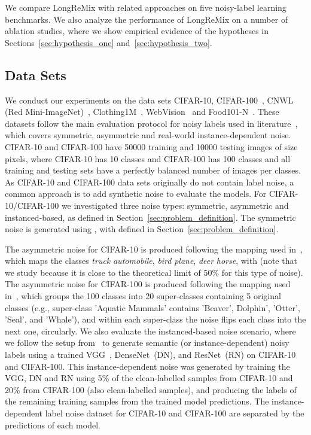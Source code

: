 \documentclass[review]{elsarticle}
\begin{document}
We compare LongReMix with related approaches on five noisy-label learning benchmarks. We also analyze the performance of LongReMix on a number of ablation studies, where we show empirical evidence of the hypotheses in Sections~\ref{sec:hypothesis_one} and~\ref{sec:hypothesis_two}. 


\subsection{Data Sets}
\label{sec:datasets}

We conduct our experiments on the data sets  CIFAR-10, CIFAR-100~\cite{krizhevsky2009learning}, CNWL (Red Mini-ImageNet)~\cite{jiang2020beyond},
Clothing1M~\cite{xiao2015learning}, WebVision~\cite{li2017WebVision} and Food101-N~\cite{lee2018cleannet}. These datasets follow the main evaluation protocol for noisy labels used in literature~\cite{li2020dividemix,ren2018learning,shu2019meta}, which covers symmetric, asymmetric and real-world instance-dependent noise. CIFAR-10 and CIFAR-100 have 50000 training and 10000 testing images of size  pixels, where CIFAR-10 has 10 classes and CIFAR-100 has 100 classes and all training and testing sets have a perfectly balanced number of images per classes. As CIFAR-10 and CIFAR-100 data sets originally do not contain label noise, a common approach is to add synthetic noise to evaluate the models. For CIFAR-10/CIFAR-100 we investigated three  noise types: symmetric, asymmetric and instanced-based, as defined in Section~\ref{sec:problem_definition}. 
The symmetric noise is generated using , with   defined in Section~\ref{sec:problem_definition}.


 The asymmetric noise for CIFAR-10 is produced following the mapping used in~\cite{li2020dividemix}, which maps the classes \emph{truck}  \emph{automobile}, \emph{bird}  \emph{plane}, \emph{deer}  \emph{horse}, with  (note that we study  because it is close to the theoretical limit of 50\% for this type of noise). The asymmetric noise for CIFAR-100 is produced following the mapping used in~\cite{patrini2017making}, which groups the 100 classes into 20 super-classes containing 5 original classes (e.g., super-class 'Aquatic Mammals' contains 'Beaver', Dolphin', 'Otter', 'Seal', and 'Whale'), and within each super-class the noise flips each class into the next one, circularly.  We also evaluate the instanced-based noise scenario, where 
 we follow the setup from~\cite{rog} to generate semantic (or instance-dependent) noisy labels using a trained VGG~\cite{vgg}, DenseNet~(DN), and ResNet~(RN) on CIFAR-10 and CIFAR-100. This instance-dependent noise was generated by training the VGG, DN and RN using 5\% of the clean-labelled samples from CIFAR-10 and 20\% from CIFAR-100 (also clean-labelled samples), and producing the labels of the remaining training samples from the trained model predictions. 
 The instance-dependent label noise dataset for CIFAR-10 and CIFAR-100 are separated by the predictions of each model.
 
\end{document}
